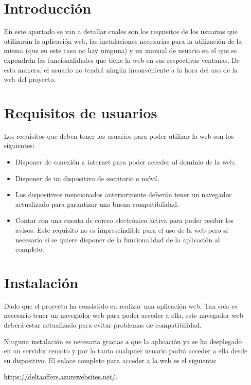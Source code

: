 \section{Introducción}
En este apartado se van a detallar cuales son los requisitos de los usuarios que utilizarán la aplicación web, las instalaciones necesarias para la utilización de la misma (que en este caso no hay ninguna) y un manual de usuario en el que se expondrán las funcionalidades que tiene la web en sus respectivas ventanas. De esta manera, el usuario no tendrá ningún inconveniente a la hora del uso de la web del proyecto.
\section{Requisitos de usuarios}
Los requisitos que deben tener los usuarios para poder utilizar la web son los siguientes:

\begin{itemize}
\item Disponer de conexión a internet para poder acceder al dominio de la web.
\item Disponer de un dispositivo de escritorio o móvil.
\item Los dispositivos mencionados anteriormente deberán tener un navegador actualizado para garantizar una buena compatibilidad.
\item Contar con una cuenta de correo electrónico activa para poder recibir los avisos. Este requisito no es imprescindible para el uso de la web pero si necesario si se quiere disponer de la funcionalidad de la aplicación al completo.
\end{itemize}
\section{Instalación}
Dado que el proyecto ha consistido en realizar una aplicación web. Tan solo es necesario tener un navegador web para poder acceder a ella, este navegador web deberá estar actualizado para evitar problemas de compatibilidad. 

Ninguna instalación es necesaria gracias a que la aplicación ya se ha desplegado en un servidor remoto y por lo tanto cualquier usuario podrá acceder a ella desde su dispositivo. El enlace completo para acceder a la web es el siguiente:

\href{https://deltaoffers.azurewebsites.net/}{https://deltaoffers.azurewebsites.net/}\label{enlace:web}.


